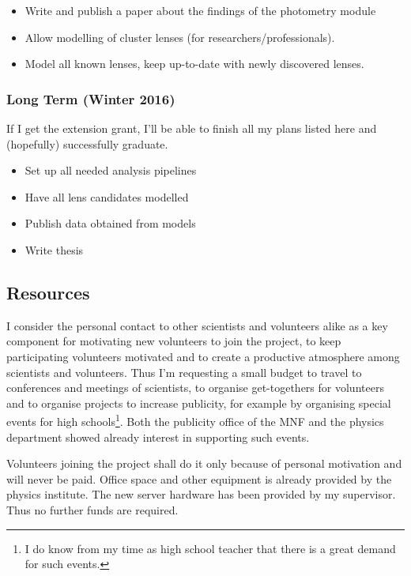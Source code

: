 \documentclass[11pt]{article}
\begin{document}
\begin{itemize}
  \item Write and publish a paper about the findings of the photometry module
  \item Allow modelling of cluster lenses (for researchers/professionals).
  \item Model all known lenses, keep up-to-date with newly discovered lenses.
\end{itemize}



\subsubsection{Long Term (Winter 2016)} \label{sec:plan_long}
If I get the extension grant, I'll be able to finish all my plans listed here and (hopefully) successfully graduate.

\begin{itemize}
  \item Set up all needed analysis pipelines
  \item Have all lens candidates modelled
  \item Publish data obtained from models
  \item Write thesis
\end{itemize}
  
  

\subsection{Resources}

I consider the personal contact to other scientists and volunteers alike as a key component for motivating new volunteers to join the project, to keep participating volunteers motivated and to create a productive atmosphere among scientists and volunteers.
Thus I'm requesting a small budget to travel to conferences and meetings of scientists, to organise get-togethers for volunteers and to organise projects to increase publicity, for example by organising special events for high schools\footnote{I do know from my time as high school teacher that there is a great demand for such events.}. Both the publicity office of the MNF and the physics department showed already interest in supporting such events.

Volunteers joining the project shall do it only because of personal motivation and will never be paid.
Office space and other equipment is already provided by the physics institute.
The new server hardware has been provided by my supervisor.
Thus no further funds are required.
\end{document}
